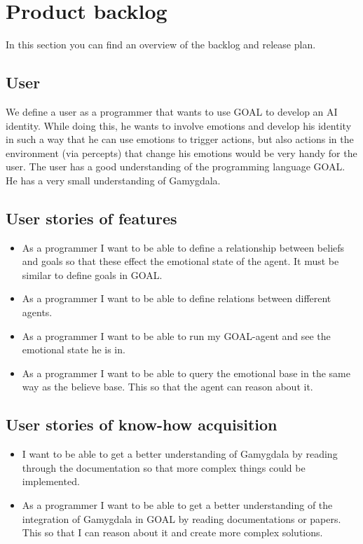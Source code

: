 \documentclass[]{article}
\begin{document}
\section{Product backlog}
In this section you can find an overview of the backlog and release plan.
\subsection{User}
We define a user as a programmer that wants to use GOAL to develop an AI identity. While doing this, he wants to involve emotions and develop his identity in such a way that he can use emotions to trigger actions, but also actions in the environment (via percepts) that change his emotions would be very handy for the user. The user has a good understanding of the programming language GOAL. He has a very small understanding of Gamygdala.
\subsection{User stories of features}
\begin{itemize}
\item As a programmer I want to be able to define a relationship between beliefs and goals so that these effect the emotional state of the agent. It must be similar to define goals in GOAL.

\item As a programmer I want to be able to define relations between different agents.

\item As a programmer I want to be able to run my GOAL-agent and see the emotional state he is in.

\item As a programmer I want to be able to query the emotional base in the same way as the believe base. This so that the agent can reason about it.
\end{itemize}

\subsection{User stories of know-how acquisition}
\begin{itemize}
\item I want to be able to get a better understanding of Gamygdala by reading through the documentation so that more complex things could be implemented.

\item As a programmer I want to be able to get a better understanding of the integration of Gamygdala in GOAL by reading documentations or papers. This so that I can reason about it and create more complex solutions.
\end{itemize}
\end{document}
